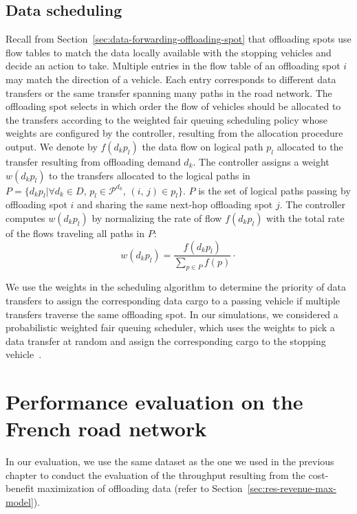 \subsection{Data scheduling} 
\label{sec:scheduling}

Recall from Section~\ref{sec:data-forwarding-offloading-spot} that offloading spots use flow tables to match the data locally available with the stopping vehicles and decide an action to take. Multiple entries in the flow table of an offloading spot $i$ may match the direction of a vehicle. Each entry corresponds to different data transfers or the same transfer spanning many paths in the road network. The offloading spot selects in which order the flow of vehicles should be allocated to the transfers according to the weighted fair queuing scheduling policy whose weights are configured by the controller, resulting from the allocation procedure output. We denote by $f(d_kp_l)$ the data flow on logical path $p_l$ allocated to the transfer resulting from offloading demand $d_k$. The controller assigns a weight $w(d_kp_l)$ to the transfers allocated to the logical paths in $P = \{d_kp_l | \forall d_k\in D,\, p_l\in \mathcal{P}^{d_k},\, (i,\,j) \in p_l\}$. $P$ is the set of logical paths passing by offloading spot $i$ and sharing the same next-hop offloading spot $j$. The controller computes $w(d_kp_l)$ by normalizing the rate of flow $f(d_kp_l)$ with the total rate of the flows traveling all paths in $P$:
\begin{equation}
    w(d_kp_l) = \frac{f(d_kp_l)}{\sum_{p\in P} f(p)}\cdot
\end{equation}

We use the weights in the scheduling algorithm to determine the priority of data transfers to assign the corresponding data cargo to a passing vehicle if multiple transfers traverse the same offloading spot. In our simulations, we considered a probabilistic weighted fair queuing scheduler, which uses the weights to pick a data transfer at random and assign the corresponding cargo to the stopping vehicle~\cite{shreedhar1996efficient}.


\section{Performance evaluation on the French road network}
\label{sec:throughput-max-model-eval}

In our evaluation, we use the same dataset as the one we used in the previous chapter to conduct the evaluation of the throughput resulting from the cost-benefit maximization of offloading data (refer to Section~\ref{sec:res-revenue-max-model}).

